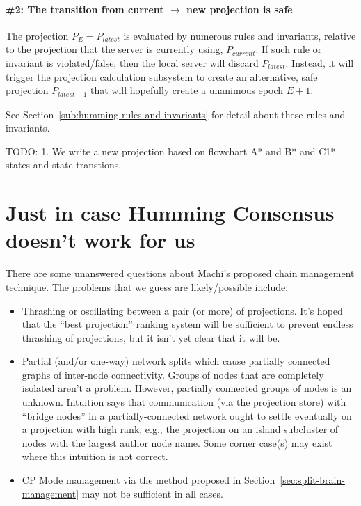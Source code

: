 \documentclass[preprint,10pt]{sigplanconf}
\begin{document}
\paragraph{\#2: The transition from current $\rightarrow$ new projection is
safe}

The projection $P_E = P_{latest}$ is evaluated by numerous rules and
invariants, relative to the projection that the server is currently
using, $P_{current}$.  If such rule or invariant is violated/false,
then the local server will discard $P_{latest}$.  Instead, it will
trigger the projection calculation subsystem to create an alternative,
safe projection $P_{latest+1}$ that will hopefully create a unanimous
epoch $E+1$.

See Section~\ref{sub:humming-rules-and-invariants} for detail about
these rules and invariants.

TODO:
1. We write a new projection based on flowchart A* and B* and C1* states and
state transtions.

\section{Just in case Humming Consensus doesn't work for us}

There are some unanswered questions about Machi's proposed chain
management technique.  The problems that we guess are likely/possible
include:

\begin{itemize}

\item Thrashing or oscillating between a pair (or more) of
  projections.  It's hoped that the ``best projection'' ranking system
  will be sufficient to prevent endless thrashing of projections, but
  it isn't yet clear that it will be.

\item Partial (and/or one-way) network splits which cause partially
  connected graphs of inter-node connectivity.  Groups of nodes that
  are completely isolated aren't a problem.  However, partially
  connected groups of nodes is an unknown.  Intuition says that
  communication (via the projection store) with ``bridge nodes'' in a
  partially-connected network ought to settle eventually on a
  projection with high rank, e.g., the projection on an island
  subcluster of nodes with the largest author node name.  Some corner
  case(s) may exist where this intuition is not correct.

\item CP Mode management via the method proposed in
  Section~\ref{sec:split-brain-management} may not be sufficient in
  all cases.

\end{itemize}
\end{document}
